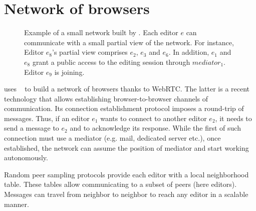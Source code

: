 
\section{Network of browsers}
\label{sec:network}

\begin{figure}
  \centering
  
  \caption{Example of a small network built by \SPRAY. Each editor $e$ can
    communicate with a small partial view of the network. For instance, Editor
    $e_8$'s partial view comprises $e_2$, $e_3$ and $e_6$. In addition, $e_1$
    and $e_8$ grant a public access to the editing session through
    $mediator_1$. Editor $e_9$ is joining.}
  \label{fig:spray}
\end{figure}


\CRATE uses \SPRAY~\cite{nedelec2015spray} to build a network of browsers thanks
to WebRTC. The latter is a recent technology that allows establishing
browser-to-browser channels of communication. Its connection establishment
protocol imposes a round-trip of messages. Thus, if an editor $e_1$ wants to
connect to another editor $e_2$, it needs to send a message to $e_2$ and to
acknowledge its response. While the first of such connection must use a mediator
(e.g. mail, dedicated server etc.), once established, the network can assume the
position of mediator and start working autonomously.

Random peer sampling protocols provide each editor with a local neighborhood
table. These tables allow communicating to a subset of peers (here
editors). Messages can travel from neighbor to neighbor to reach any editor in a
scalable manner.



